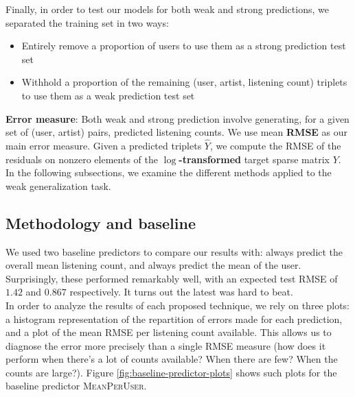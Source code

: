\documentclass{article}
\begin{document}
  Finally, in order to test our models for both weak and strong predictions, we separated the training set in two ways:
  \begin{itemize}
    \item Entirely remove a proportion of users to use them as a strong prediction test set
    \item Withhold a proportion of the remaining (user, artist, listening count) triplets to use them as a weak prediction test set
  \end{itemize}

  \textbf{Error measure}: Both weak and strong prediction involve generating, for a given set of (user, artist) pairs, predicted listening counts. We use mean \textbf{RMSE} as our main error measure. Given a predicted triplets $\hat{Y}$, we compute the RMSE of the residuals on nonzero elements of the \textbf{$\log$-transformed} target sparse matrix $Y$.\\

  In the following subsections, we examine the different methods applied to the weak generalization task.

  \subsection{Methodology and baseline}
  We used two baseline predictors to compare our results with: always predict the overall mean listening count, and always predict the mean of the user. Surprisingly, these performed remarkably well, with an expected test RMSE of $1.42$ and $0.867$ respectively. It turns out the latest was hard to beat.\\
  In order to analyze the results of each proposed technique, we rely on three plots: a histogram representation of the repartition of errors made for each prediction, and a plot of the mean RMSE per listening count available. This allows us to diagnose the error more precisely than a single RMSE measure (how does it perform when there's a lot of counts available? When there are few? When the counts are large?). Figure \ref{fig:baseline-predictor-plots} shows such plots for the baseline predictor \textsc{MeanPerUser}.
\end{document}
